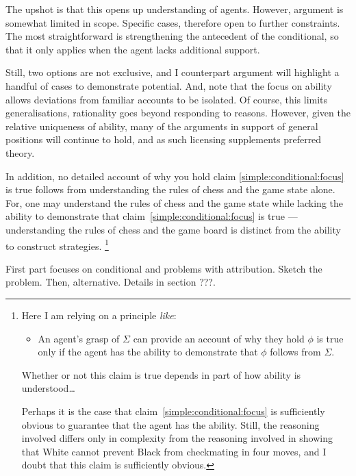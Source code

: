 \documentclass[10pt]{article}
\begin{document}
\begin{note}
  The upshot is that this opens up understanding of agents.
  However, argument is somewhat limited in scope.
  Specific cases, therefore open to further constraints.
  The most straightforward is strengthening the antecedent of the conditional, so that it only applies when the agent lacks additional support.

  Still, two options are not exclusive, and I counterpart argument will highlight a handful of cases to demonstrate potential.
  And, note that the focus on ability allows deviations from familiar accounts to be isolated.
  Of course, this limits generalisations, rationality goes beyond responding to reasons.
  However, given the relative uniqueness of ability, many of the arguments in support of general positions will continue to hold, and as such licensing supplements preferred theory.
\end{note}

\begin{note}
In addition, no detailed account of why you hold claim \ref{simple:conditional:focus} is true follows from understanding the rules of chess and the game state alone.
For, one may understand the rules of chess and the game state while lacking the ability to demonstrate that claim~\ref{simple:conditional:focus} is true --- understanding the rules of chess and the game board is distinct from the ability to construct strategies.\nolinebreak
\footnote{
  Here I am relying on a principle \emph{like}:
  \begin{itemize}
  \item An agent's grasp of \(\Sigma\) can provide an account of why they hold \(\phi\) is true only if the agent has the ability to demonstrate that \(\phi\) follows from \(\Sigma\).
  \end{itemize}
  {
    \color{red}
    Whether or not this claim is true depends in part of how ability is understood\dots
  }

  Perhaps it is the case that claim~\ref{simple:conditional:focus} is sufficiently obvious to guarantee that the agent has the ability.
  Still, the reasoning involved differs only in complexity from the reasoning involved in showing that White cannot prevent Black from checkmating in four moves, and I doubt that this claim is sufficiently obvious.
}
\end{note}

\begin{note}
  First part focuses on conditional and problems with attribution.
  Sketch the problem.
  Then, alternative.
  Details in {\color{red} section ???}.
\end{note}
\end{document}
